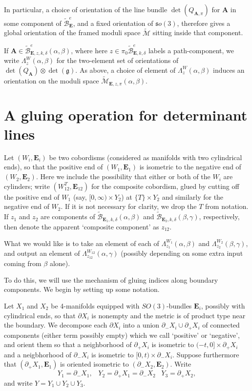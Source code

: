 \documentclass[10pt,a4paper]{amsart}
\theoremstyle{definition}
\theoremstyle{remark}
\numberwithin{figure}{qchap}
\begin{document}
In particular, a choice of orientation of the line bundle $\det(Q_{\mathbf{A},\pi})$ for $\mathbf{A}$ in some component of $\widetilde{\mathcal B}^e_{\mathbf{E}}$, and a fixed orientation of $\mathfrak so(3)$, therefore gives a global orientation of the framed moduli space $\widetilde{\mathcal M}$ sitting inside that component.

If $\mathbf{A} \in \widetilde{\mathcal B}^e_{\mathbf{E},z,k,\delta}(\alpha, \beta)$, where here $z \in \pi_0 \widetilde{\mathcal B}^e_{\mathbf{E}, k, \delta}$ labels a path-component, we write $\Lambda^W_z(\alpha, \beta)$ for the two-element set of orientations of $\det(Q_{\mathbf{A}}) \otimes \det(\mathfrak g)$. As above, a choice of element of $\Lambda^W_z(\alpha, \beta)$ induces an orientation on the moduli space $\widetilde{\mathcal M}_{\mathbf{E},z,\pi}(\alpha, \beta)$.

\section{A gluing operation for determinant lines}\label{sec:or-gluing1}
Let $(W_i, \mathbf{E}_i)$ be two cobordisms (considered as manifolds with two cylindrical ends), so that the positive end of $(W_1,\mathbf{E}_1)$ is isometric to the negative end of $(W_2,\mathbf{E}_2)$. Here we include the possibility that either or both of the $W_i$ are cylinders; write $(W_{12}^T, \mathbf{E}_{12})$ for the composite cobordism, glued by cutting off the positive end of $W_1$ (say, $[0, \infty) \times Y_2$) at $\{T\} \times Y_2$ and similarly for the negative end of $W_2$. If it is not necessary for clarity, we drop the $T$ from notation. If $z_1$ and $z_2$ are components of $\widetilde{\mathcal B}_{\mathbf{E}_1, k, \delta}(\alpha, \beta)$ and $\widetilde{\mathcal B}_{\mathbf{E}_2, k, \delta}(\beta, \gamma)$, respectively, then denote the apparent `composite component' as $z_{12}$. 

What we would like is to take an element of each of $\Lambda^{W_1}_{z_1}(\alpha, \beta)$ and $\Lambda^{W_2}_{z_2}(\beta, \gamma)$, and output an element of $\Lambda^{W_{12}}_{z_{12}}(\alpha, \gamma)$ (possibly depending on some extra input coming from $\beta$ alone).

To do this, we will use the mechanism of gluing indices along boundary components. We begin by setting up some notation.

Let $X_1$ and $X_2$ be 4-manifolds equipped with $SO(3)$-bundles $\mathbf{E}_i$, possibly with cylindrical ends, so that $\partial X_i$ is nonempty and the metric is of product type near the boundary. We decompose each $\partial X_i$ into a union $\partial_- X_i \cup \partial_+ X_i$ of connected components (either term possibly empty) which we call `positive' or `negative', and orient them so that a neighborhood of $\partial_+ X_i$ is isometric to $(-t, 0] \times \partial_+ X_i$ and a neigbhorhood of $\partial_- X_i$ is isometric to $[0,t) \times \partial_- X_i$. Suppose furthermore that $(\partial_+ X_1, \mathbf{E}_1)$ is oriented isometric to $(\partial_- X_2, \mathbf{E}_2)$. Write $$Y_1 = \partial_- X_1, \;\;\; Y_2 = \partial_+ X_1 = \partial_- X_2 \;\;\; Y_3 = \partial_+ X_2,$$ and write $Y = Y_1 \cup Y_2 \cup Y_3$.
\end{document}
